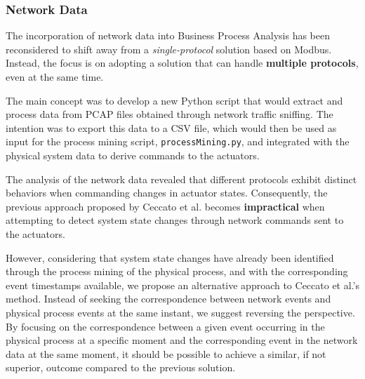 \subsubsection{Network Data}
\label{subsub:4_proc_mining_net}
The incorporation of network data into Business Process Analysis has been reconsidered to shift away from a \textit{single-protocol} solution based on Modbus. Instead, the focus is on adopting a solution that can handle \textbf{multiple protocols}, even at the same time.

The main concept was to develop a new Python script that would extract and process data from PCAP files obtained through network traffic sniffing. The intention was to export this data to a CSV file, which would then be used as input for the process mining script, \texttt{processMining.py}, and integrated with the physical system data to derive commands to the actuators.


\bigskip
The analysis of the network data revealed that different protocols exhibit distinct behaviors when commanding changes in actuator states. Consequently, the previous approach proposed by Ceccato et al. becomes \textbf{impractical} when attempting to detect system state changes through network commands sent to the actuators.

However, considering that system state changes have already been identified through the process mining of the physical process, and with the corresponding event timestamps available, we propose an alternative approach to Ceccato et al.'s method. Instead of seeking the correspondence between network events and physical process events at the same instant, we suggest reversing the perspective. By focusing on the correspondence between a given event occurring in the physical process at a specific moment and the corresponding event in the network data at the same moment, it should be possible to achieve a similar, if not superior, outcome compared to the previous solution.

